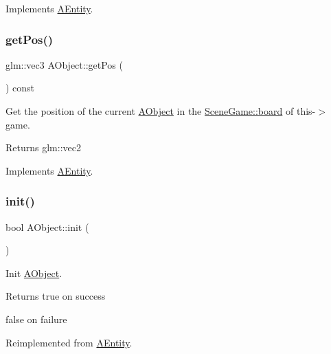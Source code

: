 Implements \hyperlink{class_a_entity_a44aa82958386de50cd9a6c836461114a}{A\+Entity}.

\mbox{\label{class_a_object_ab5840de6100bba8bf93a186a0a802708}} 
\subsubsection{\texorpdfstring{get\+Pos()}{getPos()}}
{\footnotesize\ttfamily glm\+::vec3 A\+Object\+::get\+Pos (\begin{DoxyParamCaption}{ }\end{DoxyParamCaption}) const\hspace{0.3cm}{\ttfamily [virtual]}}



Get the position of the current \hyperlink{class_a_object}{A\+Object} in the \hyperlink{class_scene_game_a2306af8a268c9d476d1060fa3daa1ac5}{Scene\+Game\+::board} of this-\/$>$game. 

\begin{DoxyReturn}{Returns}
glm\+::vec2 
\end{DoxyReturn}


Implements \hyperlink{class_a_entity_afbdb591f06debd7e20e0cb98f14717e4}{A\+Entity}.

\mbox{\label{class_a_object_afa83ef1c900a47453524219788327b86}} 
\subsubsection{\texorpdfstring{init()}{init()}}
{\footnotesize\ttfamily bool A\+Object\+::init (\begin{DoxyParamCaption}{ }\end{DoxyParamCaption})\hspace{0.3cm}{\ttfamily [virtual]}}



Init \hyperlink{class_a_object}{A\+Object}. 

\begin{DoxyReturn}{Returns}
true on success 

false on failure 
\end{DoxyReturn}


Reimplemented from \hyperlink{class_a_entity_a450361b684fa02e4ffe0ba406b8e3b30}{A\+Entity}.



